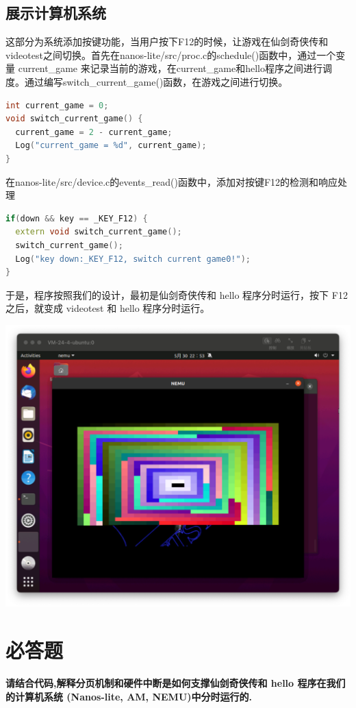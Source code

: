 \documentclass[UTF8,a4paper,10pt]{ctexart}
\begin{document}
\subsection{展示计算机系统}
这部分为系统添加按键功能，当用户按下F12的时候，让游戏在仙剑奇侠传和videotest之间切换。首先在nanos-lite/src/proc.c的schedule()函数中，通过一个变量 current\_game 来记录当前的游戏，在current\_game和hello程序之间进行调度。通过编写switch\_current\_game()函数，在游戏之间进行切换。
\begin{lstlisting}[language = C++]
int current_game = 0;
void switch_current_game() {
  current_game = 2 - current_game;
  Log("current_game = %d", current_game);
}
\end{lstlisting}
在nanos-lite/src/device.c的events\_read()函数中，添加对按键F12的检测和响应处理
\begin{lstlisting}[language = C++]
if(down && key == _KEY_F12) {
  extern void switch_current_game();
  switch_current_game();
  Log("key down:_KEY_F12, switch current game0!");
}
\end{lstlisting}
于是，程序按照我们的设计，最初是仙剑奇侠传和 hello 程序分时运行，按下 F12 之后，就变成 videotest 和 hello 程序分时运行。
\begin{center}
  \includegraphics*[scale=0.35]{img/16.png}
\end{center}
\section{必答题}

\textbf{请结合代码,解释分页机制和硬件中断是如何支撑仙剑奇侠传和 hello 程序在我们的计算机系统 (Nanos-lite, AM, NEMU)中分时运行的.}
\end{document}
